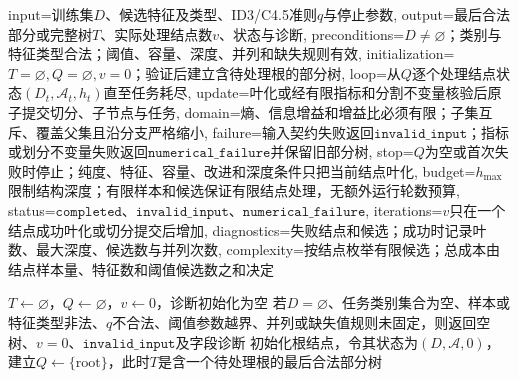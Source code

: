 \begin{AlgorithmContract}{
  input={训练集$D$、候选特征及类型、ID3/C4.5准则$q$与停止参数},
  output={最后合法部分或完整树$T$、实际处理结点数$v$、状态与诊断},
  preconditions={$D\ne\varnothing$；类别与特征类型合法；阈值、容量、深度、并列和缺失规则有效},
  initialization={$T=\varnothing,Q=\varnothing,v=0$；验证后建立含待处理根的部分树},
  loop={从$Q$逐个处理结点状态$(D_t,\mathcal A_t,h_t)$直至任务耗尽},
  update={叶化或经有限指标和分割不变量核验后原子提交切分、子节点与任务},
  domain={熵、信息增益和增益比必须有限；子集互斥、覆盖父集且沿分支严格缩小},
  failure={输入契约失败返回$\mathtt{invalid\_input}$；指标或划分不变量失败返回$\mathtt{numerical\_failure}$并保留旧部分树},
  stop={$Q$为空或首次失败时停止；纯度、特征、容量、改进和深度条件只把当前结点叶化},
  budget={$h_{\max}$限制结构深度；有限样本和候选保证有限结点处理，无额外运行轮数预算},
  status={$\mathtt{completed}$、$\mathtt{invalid\_input}$、$\mathtt{numerical\_failure}$},
  iterations={$v$只在一个结点成功叶化或切分提交后增加},
  diagnostics={失败结点和候选；成功时记录叶数、最大深度、候选数与并列次数},
  complexity={按结点枚举有限候选；总成本由结点样本量、特征数和阈值候选数之和决定}
}
\begin{algorithm}[H]
\caption{ID3/C4.5统一递归生成流程}\label{alg:V2-C04-id3-c45}
$T\leftarrow\varnothing$，$Q\leftarrow\varnothing$，$v\leftarrow0$，诊断初始化为空\;
若$D=\varnothing$、任务类别集合为空、样本或特征类型非法、$q$不合法、阈值参数越界、并列或缺失值规则未固定，则返回空树、$v=0$、$\mathtt{invalid\_input}$及字段诊断\;
初始化根结点，令其状态为$(D,\mathcal A,0)$，建立$Q\leftarrow\{\mathrm{root}\}$，此时$T$是含一个待处理根的最后合法部分树\;
\end{algorithm}
\end{AlgorithmContract}

